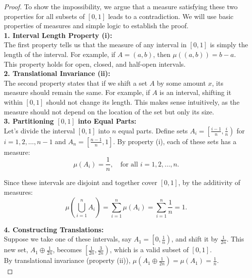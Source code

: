 \begin{proof}

    To show the impossibility, we argue that a measure satisfying these two properties for all subsets of $[0, 1]$ leads to a contradiction. We will use basic properties of measures and simple logic to establish the proof.\\

\textbf{1. Interval Length Property (i):}  \\

   The first property tells us that the measure of any interval in $[0, 1]$ is simply the length of the interval. For example, if $A = (a, b)$, then $\mu((a, b)) = b - a$. This property holds for open, closed, and half-open intervals.\\

\textbf{2. Translational Invariance (ii):}  \\

   The second property states that if we shift a set $A$ by some amount $x$, its measure should remain the same. For example, if $A$ is an interval, shifting it within $[0, 1]$ should not change its length. This makes sense intuitively, as the measure should not depend on the location of the set but only its size.\\

\textbf{3. Partitioning $[0, 1]$ into Equal Parts:}  \\

   Let’s divide the interval $[0, 1]$ into $n$ equal parts. Define sets $A_i = \left[\frac{i-1}{n}, \frac{i}{n}\right)$ for $i = 1, 2, \ldots, n-1$ and $A_n = \left[\frac{n-1}{n}, 1\right]$. By property (i), each of these sets has a measure:
   \[
   \mu(A_i) = \frac{1}{n}, \quad \text{for all } i = 1, 2, \ldots, n.
   \]
   
   Since these intervals are disjoint and together cover $[0, 1]$, by the additivity of measures:
   \[
   \mu\left(\bigcup_{i=1}^{n} A_i\right) = \sum_{i=1}^{n} \mu(A_i) = \sum_{i=1}^{n} \frac{1}{n} = 1.
   \]

\textbf{4. Constructing Translations:}  \\

   Suppose we take one of these intervals, say $A_1 = \left[0, \frac{1}{n}\right)$, and shift it by $\frac{1}{2n}$. This new set, $A_1 \oplus \frac{1}{2n}$, becomes $\left[\frac{1}{2n}, \frac{3}{2n}\right)$, which is a valid subset of $[0, 1]$.\\

   By translational invariance (property (ii)), $\mu(A_1 \oplus \frac{1}{2n}) = \mu(A_1) = \frac{1}{n}$.\\


\end{proof}
